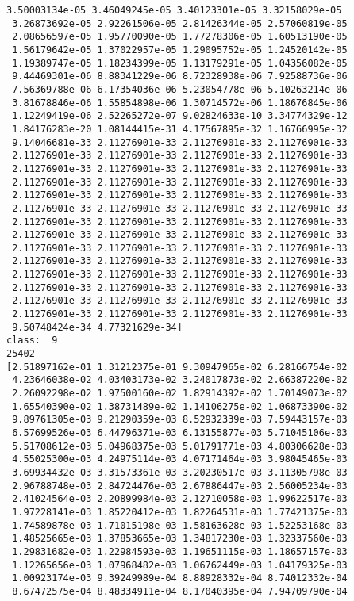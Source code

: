 \documentclass[11pt]{article}
\begin{document}
\begin{Verbatim}[commandchars=\\\{\}]
 3.50003134e-05 3.46049245e-05 3.40123301e-05 3.32158029e-05
 3.26873692e-05 2.92261506e-05 2.81426344e-05 2.57060819e-05
 2.08656597e-05 1.95770090e-05 1.77278306e-05 1.60513190e-05
 1.56179642e-05 1.37022957e-05 1.29095752e-05 1.24520142e-05
 1.19389747e-05 1.18234399e-05 1.13179291e-05 1.04356082e-05
 9.44469301e-06 8.88341229e-06 8.72328938e-06 7.92588736e-06
 7.56369788e-06 6.17354036e-06 5.23054778e-06 5.10263214e-06
 3.81678846e-06 1.55854898e-06 1.30714572e-06 1.18676845e-06
 1.12249419e-06 2.52265272e-07 9.02824633e-10 3.34774329e-12
 1.84176283e-20 1.08144415e-31 4.17567895e-32 1.16766995e-32
 9.14046681e-33 2.11276901e-33 2.11276901e-33 2.11276901e-33
 2.11276901e-33 2.11276901e-33 2.11276901e-33 2.11276901e-33
 2.11276901e-33 2.11276901e-33 2.11276901e-33 2.11276901e-33
 2.11276901e-33 2.11276901e-33 2.11276901e-33 2.11276901e-33
 2.11276901e-33 2.11276901e-33 2.11276901e-33 2.11276901e-33
 2.11276901e-33 2.11276901e-33 2.11276901e-33 2.11276901e-33
 2.11276901e-33 2.11276901e-33 2.11276901e-33 2.11276901e-33
 2.11276901e-33 2.11276901e-33 2.11276901e-33 2.11276901e-33
 2.11276901e-33 2.11276901e-33 2.11276901e-33 2.11276901e-33
 2.11276901e-33 2.11276901e-33 2.11276901e-33 2.11276901e-33
 2.11276901e-33 2.11276901e-33 2.11276901e-33 2.11276901e-33
 2.11276901e-33 2.11276901e-33 2.11276901e-33 2.11276901e-33
 2.11276901e-33 2.11276901e-33 2.11276901e-33 2.11276901e-33
 2.11276901e-33 2.11276901e-33 2.11276901e-33 2.11276901e-33
 9.50748424e-34 4.77321629e-34]
class:  9
25402
[2.51897162e-01 1.31212375e-01 9.30947965e-02 6.28166754e-02
 4.23646038e-02 4.03403173e-02 3.24017873e-02 2.66387220e-02
 2.26092298e-02 1.97500160e-02 1.82914392e-02 1.70149073e-02
 1.65540390e-02 1.38731489e-02 1.14106275e-02 1.06873390e-02
 9.89761305e-03 9.21290359e-03 8.52932339e-03 7.59443157e-03
 6.57699526e-03 6.44796371e-03 6.13155877e-03 5.71045106e-03
 5.51708612e-03 5.04968375e-03 5.01791771e-03 4.80306628e-03
 4.55025300e-03 4.24975114e-03 4.07171464e-03 3.98045465e-03
 3.69934432e-03 3.31573361e-03 3.20230517e-03 3.11305798e-03
 2.96788748e-03 2.84724476e-03 2.67886447e-03 2.56005234e-03
 2.41024564e-03 2.20899984e-03 2.12710058e-03 1.99622517e-03
 1.97228141e-03 1.85220412e-03 1.82264531e-03 1.77421375e-03
 1.74589878e-03 1.71015198e-03 1.58163628e-03 1.52253168e-03
 1.48525665e-03 1.37853665e-03 1.34817230e-03 1.32337560e-03
 1.29831682e-03 1.22984593e-03 1.19651115e-03 1.18657157e-03
 1.12265656e-03 1.07968482e-03 1.06762449e-03 1.04179325e-03
 1.00923174e-03 9.39249989e-04 8.88928332e-04 8.74012332e-04
 8.67472575e-04 8.48334911e-04 8.17040395e-04 7.94709790e-04

\end{Verbatim}
\end{document}
